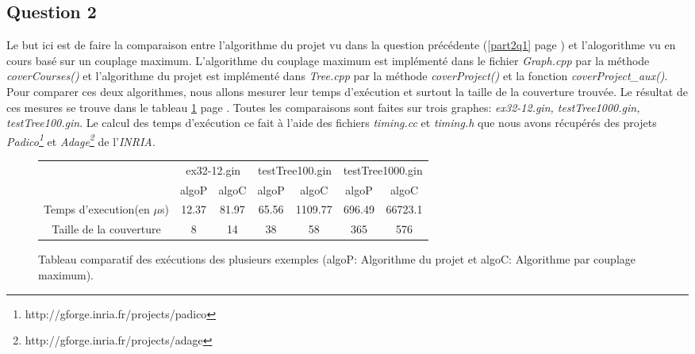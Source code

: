   \subsection{Question 2}
  Le but ici est de faire la comparaison entre l'algorithme du projet vu
  dans la question précédente (\ref{part2q1} page \pageref{part2q1}) et
  l'alogorithme vu en cours basé sur un couplage maximum.\newline
  \indent L'algorithme du couplage maximum est implémenté dans le fichier
  \emph{Graph.cpp} par la méthode \emph{coverCourses()} et l'algorithme
  du projet est implémenté dans \emph{Tree.cpp} par la méthode
  \emph{coverProject()} et la fonction \emph{coverProject\_aux()}.\newline
  \indent Pour comparer ces deux algorithmes, nous allons mesurer leur
  temps d'exécution et surtout la taille de la couverture trouvée. Le
  résultat de ces mesures se trouve dans le tableau \ref{tableau}
  page \pageref{tableau}. Toutes les comparaisons sont faites sur trois
  graphes: \emph{ex32-12.gin, testTree1000.gin, testTree100.gin}.\newline
  \indent Le calcul des temps d'exécution ce fait à l'aide des fichiers
  \emph{timing.cc} et \emph{timing.h} que nous avons récupérés des
  projets \emph{Padico\footnote{http://gforge.inria.fr/projects/padico}}
  et \emph{Adage\footnote{http://gforge.inria.fr/projects/adage}} de
  l'\emph{INRIA.}\newline

  \begin{figure}[!ht]
   \begin{center}
    \begin{tabular}{|c|c|c|c|c|c|c|}
     \cline{2-7}
     \multicolumn{1}{c|}{} & \multicolumn{2}{|c|}{ex32-12.gin}
     &\multicolumn{2}{|c|}{testTree100.gin} &
     \multicolumn{2}{|c|}{testTree1000.gin}\\ 
     \cline{2-7}
     \multicolumn{1}{c|}{} & algoP & algoC & algoP & algoC & algoP &
     algoC\\
     \hline
     Temps d'execution(en $\mu$s) & 12.37 & 81.97 & 65.56 & 1109.77 &
     696.49 & 66723.1\\
     \hline
     Taille de la couverture & 8 & 14 & 38 & 58 & 365 & 576\\
     \hline
    \end{tabular}
    \caption{Tableau comparatif des exécutions des plusieurs
    exemples (algoP: Algorithme du projet et algoC: Algorithme par
    couplage maximum).\label{tableau}} 
   \end{center}
  \end{figure}  